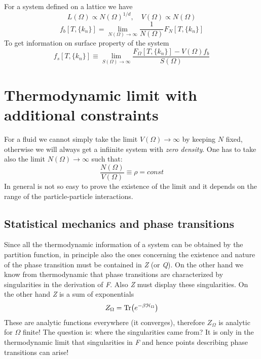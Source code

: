 \documentclass[../main/main.tex]{subfiles}
\begin{document}
For a system defined on a lattice we have
\begin{equation}
  L (\Omega ) \propto N (\Omega )^{1/d}, \quad V (\Omega ) \propto N (\Omega )
\end{equation}
\begin{equation}
  f_b [T,\{ k_n \}  ] = \lim_{N (\Omega) \rightarrow \infty } \frac{1}{N (\Omega )} F_N [T,\{ k_n \}  ]
\end{equation}
To get information on surface property of the system
\begin{equation}
  f_s [T,\{ k_n \}  ] \equiv \lim_{S (\Omega ) \rightarrow \infty } \frac{F_ \Omega [T,\{ k_n \}  ]  - V (\Omega ) f_b}{S (\Omega )}
\end{equation}

\section{Thermodynamic limit with additional constraints}
For a fluid we cannot simply take the limit \( V (\Omega ) \rightarrow \infty  \) by keeping \( N \) fixed, otherwise we will always get a infiinite system with \emph{zero density}. One has to take also the limit \( N(\Omega ) \rightarrow \infty  \) such that:
\begin{equation}
  \frac{N (\Omega )}{V (\Omega )} \equiv \rho = const
\end{equation}
In general is not so easy to prove the existence of the limit and it depends on the range of the particle-particle interactions.
\subsection{Statistical mechanics and phase transitions}
Since all the thermodynamic information of a system can be obtained by the partition function, in principle also the ones concerning the existence and nature of the phase transition must be contained in \emph{Z} (or \emph{Q}). On the other hand we know from thermodynamic that phase transitions are characterized by singularities in the derivation of \emph{F}. Also \emph{Z} must display these singularities.
On the other hand \emph{Z} is a sum of exponentials
\begin{equation}
  Z_ \Omega = \Tr(e^{-\beta \mathcal{H}_ \Omega } )
\end{equation}
These are analytic functions everywhere (it converges), therefore \( Z_ \Omega  \) is analytic for \( \Omega  \) finite!
The question is: where the singularities came from?
It is only in the thermodynamic limit that singularities in \emph{F} and hence points describing phase transitions can arise!
\end{document}
